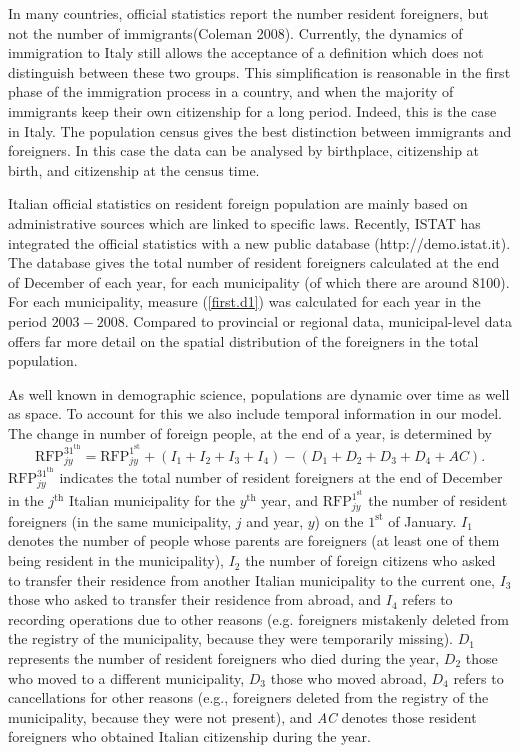 \documentclass[10pt] {article}
\theoremstyle{definition}
\theoremstyle{plain}
\begin{document}
In many countries, official statistics report the number resident foreigners, but not the number of immigrants(Coleman 2008). Currently, the dynamics of immigration to Italy still allows the acceptance of a definition which does not distinguish between these two groups. This simplification is reasonable in the first phase of the immigration process in a country, and when the majority of immigrants keep their own citizenship for a long period. Indeed, this is the case in Italy. The population census gives the best distinction between immigrants and foreigners. In this case the data can be analysed by birthplace, citizenship at birth, and citizenship at the census time. 
 
Italian official statistics on resident foreign population are mainly based on administrative sources which are linked to specific laws. Recently, ISTAT has integrated the official statistics with a new public database (http://demo.istat.it). The database gives the total number of resident foreigners calculated at the end of December of each year, for each municipality (of which there are around 8100). For each municipality, measure (\ref{first.d1}) was calculated for each year in the period $2003-2008$. Compared to provincial or regional data, municipal-level data offers far more detail on the spatial distribution of the foreigners in the total population.
 
As well known in demographic science, populations are dynamic over time as well as space. To account for this we also include temporal information in our model. The change in number of foreign people, at the end of a year, is determined by
$$
\text{RFP}^{31^\text{th}}_{jy} = \text{RFP}^{1^\text{st}}_{jy} + (I_1 + I_2 + I_3+ I_4) - (D_1 + D_2 + D_3 + D_4 + AC).
$$ 
$\text{RFP}^{31^\text{th}}_{jy}$ indicates the total number of resident foreigners at the end of December in the $j^\text{th}$ Italian municipality for the $y^\text{th}$ year, and $\text{RFP}^{1^\text{st}}_{jy}$ the number of resident foreigners (in the same municipality, $j$ and year, $y$) on the $1^\text{st}$ of January. $I_{1}$ denotes the number of people whose parents are foreigners (at least one of them being resident in the municipality), $I_{2}$ the number of foreign citizens who asked to transfer their residence from another Italian municipality to the current one, $I_{3}$ those who asked to transfer their residence from abroad, and $I_{4}$ refers to recording operations due to other reasons (e.g. foreigners mistakenly deleted from the registry of the municipality, because they were temporarily missing). $D_{1}$ represents the number of resident foreigners who died during the year, $D_{2}$ those who moved to a different municipality, $D_{3}$ those who moved abroad, $D_{4}$ refers to cancellations for other reasons (e.g., foreigners deleted from the registry of the municipality, because they were not present), and \textit{AC} denotes those resident foreigners who obtained Italian citizenship during the year. 
\end{document}
